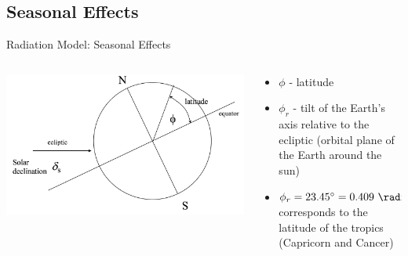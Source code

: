 \subsection{Seasonal Effects}
\begin{frame}{Radiation Model: Seasonal Effects}
\begin{columns}[T]
    \begin{column}{.5\textwidth}
    \begin{minipage}[c][0.7\textheight][c]{\linewidth}
    \includegraphics[width=1\textwidth]{fig4}\\
    \end{minipage}
    \end{column}
    \begin{column}{.5\textwidth}
    \begin{minipage}[c][0.65\textheight][c]{\linewidth}
   \begin{itemize}
   	\item $\phi$ - latitude
   	\item $\phi_r$ - tilt of the Earth's axis relative to the ecliptic (orbital plane of the Earth around the sun)
   	\item $\phi_r = 23.45^\circ = 0.409\ \radian$ corresponds to the latitude of the tropics (Capricorn and Cancer)
   \end{itemize}
      \end{minipage}
    \end{column}
  \end{columns}
\end{frame}
